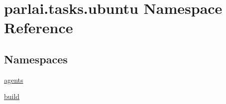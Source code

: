 \hypertarget{namespaceparlai_1_1tasks_1_1ubuntu}{}\section{parlai.\+tasks.\+ubuntu Namespace Reference}
\label{namespaceparlai_1_1tasks_1_1ubuntu}
\subsection*{Namespaces}
\begin{DoxyCompactItemize}
\item 
 \hyperlink{namespaceparlai_1_1tasks_1_1ubuntu_1_1agents}{agents}
\item 
 \hyperlink{namespaceparlai_1_1tasks_1_1ubuntu_1_1build}{build}
\end{DoxyCompactItemize}
